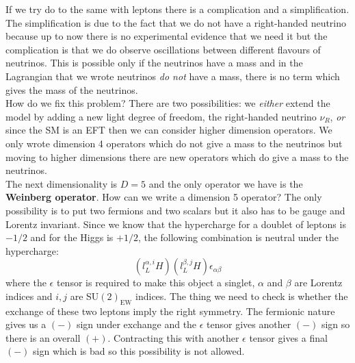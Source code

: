 \documentclass[../main.tex]{subfiles}
\begin{document}
If we try do to the same with leptons there is a complication and a simplification. The simplification is due to the fact that we do not have a right-handed neutrino because up to now there is no experimental evidence that we need it but the complication is that we do observe oscillations between different flavours of neutrinos. This is possible only if the neutrinos have a mass and in the Lagrangian that we wrote neutrinos \textit{do not} have a mass, there is no term which gives the mass of the neutrinos.\\
How do we fix this problem? There are two possibilities: we \textit{either} extend the model by adding a new light degree of freedom, the right-handed neutrino $\nu_R$, \textit{or} since the SM is an EFT then we can consider higher dimension operators. We only wrote dimension 4 operators which do not give a mass to the neutrinos but moving to higher dimensions there are new operators which do give a mass to the neutrinos.\\
The next dimensionality is $D=5$ and the only operator we have is the \textbf{Weinberg operator}. How can we write a dimension 5 operator? The only possibility is to put two fermions and two scalars but it also has to be gauge and Lorentz invariant. Since we know that the hypercharge for a doublet of leptons is $-1/2$ and for the Higgs is $+1/2$, the following combination is neutral under the hypercharge:
\[
(l_L^{\alpha,i} H)(l_L^{\beta,j} H)\epsilon_{\alpha\beta}
\]
where the $\epsilon$ tensor is required to make this object a singlet, $\alpha$ and $\beta$ are Lorentz indices and $i,j$ are SU$(2)_{\text{EW}}$ indices. The thing we need to check is whether the exchange of these two leptons imply the right symmetry. The fermionic nature gives us a $(-)$ sign under exchange and the $\epsilon$ tensor gives another $(-)$ sign so there is an overall $(+)$. Contracting this with another $\epsilon$ tensor gives a final $(-)$ sign which is bad so this possibility is not allowed. \\
\end{document}
